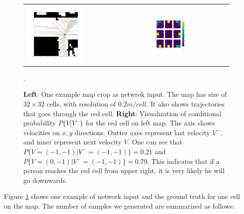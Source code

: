 
\begin{figure}[t]
\begin{tabular}{ll}
\includegraphics[width=0.48\textwidth]{figures/trajs_through_cell.png}
&
\includegraphics[width=0.48\textwidth]{figures/probs_on_that_cell.png}
\end{tabular}
\caption{\textbf{Left}: One example map crop as netwrok input. The map has size of \( 32 \times 32 \) cells, with resolution of \( 0.2m/cell\). It also shows trajectories that goes through the red cell. \textbf{Right}: Visualization of conditional probability \( P\{V | V^-\} \) for the red cell on left map. The axis shows velocities on \( x, y\) directions. Outter axes represent last velocity \( V^- \), and inner represent next velocity \( V \). One can see that \( P\{V=(-1, -1) | V^-=(-1, -1)\} = 0.21 \) and \( P\{V=(0, -1) | V^-=(-1, -1)\} = 0.79 \). This indicates that if a person reaches the red cell from upper right, it is very likely he will go downwards. }. 
\label{fig:trajs}
\end{figure}

Figure \ref{fig:trajs} shows one example of network input and the ground truth for one cell on the map. The number of samples we generated are summarized as follows:

